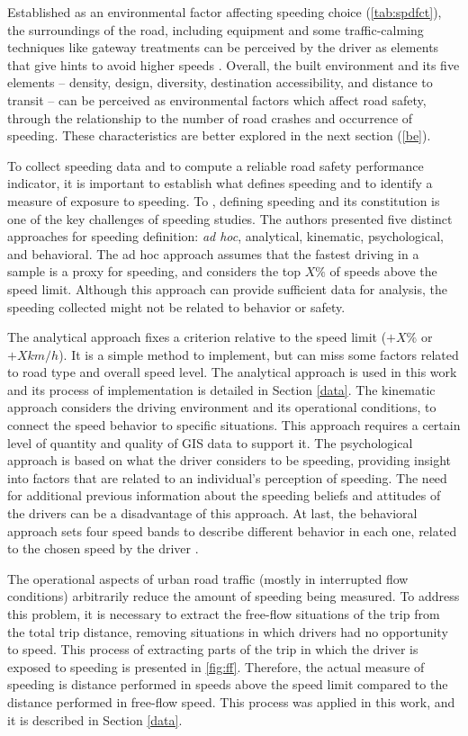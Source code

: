 Established as an environmental factor affecting speeding choice (\autoref{tab:spdfct}), the surroundings of the road, including equipment and some traffic-calming techniques like gateway treatments can be perceived by the driver as elements that give hints to avoid higher speeds \cite{WHO2008}. Overall, the built environment and its five elements – density, design, diversity, destination accessibility, and distance to transit – can be perceived as environmental factors which affect road safety, through the relationship to the number of road crashes and occurrence of speeding. These characteristics are better explored in the next section (\ref{be}). 

To collect speeding data and to compute a reliable road safety performance indicator, it is important to establish what defines speeding and to identify a measure of exposure to speeding. To \textcite{Richard2013}, defining speeding and its constitution is one of the key challenges of speeding studies. The authors presented five distinct approaches for speeding definition: \textit{ad hoc}, analytical, kinematic, psychological, and behavioral. The ad hoc approach assumes that the fastest driving in a sample is a proxy for speeding, and considers the top $X\%$ of speeds above the speed limit. Although this approach can provide sufficient data for analysis, the speeding collected might not be related to behavior or safety. 

The analytical approach fixes a criterion relative to the speed limit ($+ X\%$ or $+ X km/h$). It is a simple method to implement, but can miss some factors related to road type and overall speed level. The analytical approach is used in this work and its process of implementation is detailed in Section \ref{data}. The kinematic approach considers the driving environment and its operational conditions, to connect the speed behavior to specific situations. This approach requires a certain level of quantity and quality of GIS data to support it. The psychological approach is based on what the driver considers to be speeding, providing insight into factors that are related to an individual's perception of speeding. The need for additional previous information about the speeding beliefs and attitudes of the drivers can be a disadvantage of this approach. At last, the behavioral approach sets four speed bands to describe different behavior in each one, related to the chosen speed by the driver \cite{Richard2013}.

The operational aspects of urban road traffic (mostly in interrupted flow conditions) arbitrarily reduce the amount of speeding being measured. To address this problem, it is necessary to extract the free-flow situations of the trip from the total trip distance, removing situations in which drivers had no opportunity to speed. This process of extracting parts of the trip in which the driver is exposed to speeding is presented in \autoref{fig:ff}. Therefore, the actual measure of speeding is distance performed in speeds above the speed limit compared to the distance performed in free-flow speed. This process was applied in this work, and it is described in Section \ref{data}. 


